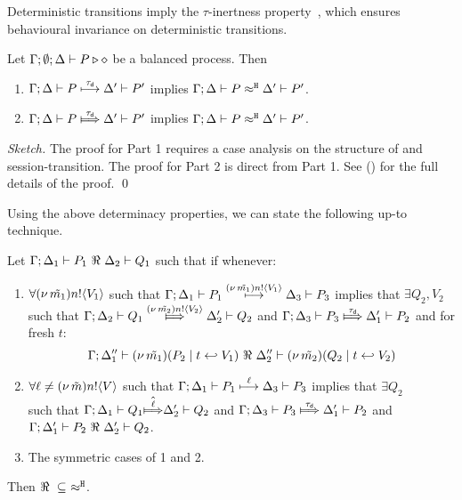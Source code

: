 Deterministic transitions imply the $\tau$-inertness property~\cite{DBLP:journals/tcs/GrooteS96}, which
ensures behavioural invariance on deterministic transitions.

\begin{proposition}
	\label{lem:tau_inert}
	Let  $\Gamma; \emptyset; \Delta \vdash P \triangleright \diamond$ be a balanced \HOp process.
	Then
	\begin{enumerate}
		\item	
				$\Gamma; \Delta \vdash P \stackrel{\tau_{\mathsf{d}}}{\longmapsto} \Delta' \vdash P'$ implies
				$\Gamma; \Delta \vdash P \approx^\mathtt{H} \Delta' \vdash P'$.
		\item	$\horel{\Gamma}{\Delta}{P}{\Hby{\dtau}}{\Delta'}{P'}$ implies
				$\Gamma; \Delta \vdash P \approx^\mathtt{H} \Delta' \vdash P'$.
	\end{enumerate}
\end{proposition}
%
\begin{proof}[Sketch]
	The proof for Part 1 requires a case analysis on the structure of
	\betatran and session-transition. The proof for Part 2 is direct from Part 1.
	See  () for the full details of the proof.
	\qed
\end{proof}


Using the above determinacy properties, we can state the following up-to technique.

\begin{lemma}
	\label{lem:up_to_deterministic_transition}
	Let $\horel{\Gamma}{\Delta_1}{P_1}{\ \Re\ }{\Delta_2}{Q_1}$ such
	that if whenever:
%
	\begin{enumerate}[1.]
		\item	$\forall (\nu\, \tilde{m_1}) n ! \langle V_1 \rangle$ such that
			$
				\Gamma; \Delta_1 \vdash P_1 \stackrel{(\nu\, \tilde{m_1}) n ! \langle V_1 \rangle}{\longmapsto} \Delta_3 \vdash P_3
			$
			implies that $\exists Q_2, V_2$ such that
			$
				\horel{\Gamma}{\Delta_2}{Q_1}{\Hby{\news{\tilde{m_2}} \bactout{n}{V_2}}}{\Delta_2'}{Q_2}
			$
			and
			$
				\horel{\Gamma}{\Delta_3}{P_3}{\Hby{\dtau}}{\Delta_1'}{P_2}
			$
			and for fresh $t$:\\
			\[
				\Gamma; \Delta_1'' \vdash (\nu\, \tilde{m_1})(P_2 \;|\; t \hookleftarrow V_1) \ \Re\  \Delta_2'' \vdash{(\nu\, \tilde{m_2})(Q_2 \;|\;t \hookleftarrow V_2)}
			\]
%
		\item	$\forall \ell \not= (\nu\, \tilde{m}) n ! \langle V \rangle$ such that
			$
				\Gamma; \Delta_1 \vdash P_1 \stackrel{\ell}{\longmapsto} \Delta_3 \vdash P_3
			$
			implies that $\exists Q_2$  \\ such that 
			$
				\horel{\Gamma}{\Delta_1}{Q_1}{\hat{\Hby{\ell}}}{\Delta_2'}{Q_2}
			$
			and
			$
				\horel{\Gamma}{\Delta_3}{P_3}{\Hby{\dtau}}{\Delta_1'}{P_2}
			$
			and
			$\horel{\Gamma}{\Delta_1'}{P_2}{\ \Re\ }{\Delta_2'}{Q_2}$.

		\item	The symmetric cases of 1 and 2.
	\end{enumerate}
	Then $\Re\ \subseteq\ \approx^\mathtt{H}$.
\end{lemma}

